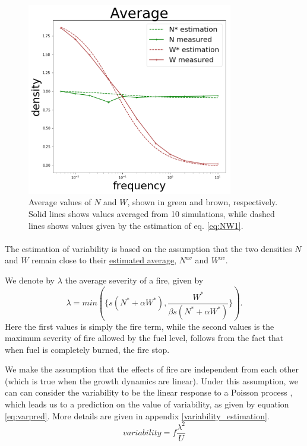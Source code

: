 \documentclass{article}
\begin{document}
\begin{figure}[h!]
\centering
\includegraphics[width=9cm]{average.png}
\caption{Average values of $N$ and $W$, shown in green and brown, respectively. Solid lines shows values averaged from 10 simulations, while dashed lines shows values given by the estimation of eq. \ref{eq:NW1}. %
\label{fig:NWE}
}
\end{figure}






\paragraph{} %
The estimation of variability is based on the assumption that the two densities $N$ and $W$ remain close to their \hyperref[average_estimation]{estimated average}, $N^{av}$ and $W^{av}$. 

We denote by $\lambda$ the average severity of a fire, given by
\[
\lambda = min(\{s(N^*+\alpha W^*), \frac{W^*}{\beta s (N^*+\alpha W^*)}\}).
\]
Here the first values is simply the fire term, while the second values is the maximum severity of fire allowed by the fuel level, follows from the fact that when fuel is completely burned, the fire stop.

We make the assumption that the effects of fire are independent from each other (which is true when the growth dynamics are linear). Under this assumption, we can can consider the variability to be the linear response to a Poisson process  \citep{zelnik_impact_2018}, which leads us to  a prediction on the value of variability, as given by equation \ref{eq:varpred}. More details are given in appendix  \ref{variability_estimation}.
\begin{equation} \label{eq:varpred}
variability = f\frac{\lambda^2}{U}
\end{equation}
\end{document}
